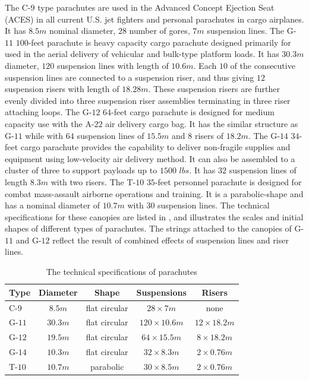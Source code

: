 The C-$9$ type parachutes are used in the Advanced Concept Ejection Seat (ACES) in all current U.S. jet fighters and personal parachutes in cargo airplanes. It has $8.5m$ nominal diameter, $28$ number of gores, $7m$ suspension lines. 
The G-$11$ $100$-feet parachute is heavy capacity cargo parachute designed primarily for used in the aerial delivery of vehicular and bulk-type platform loads. It has $30.3m$ diameter, $120$ suspension lines with length of $10.6m$. Each $10$ of the consecutive suspension lines are connected to a suspension riser, and thus giving $12$ suspension risers with length of $18.28m$. These suspension risers are further evenly divided into three suspension riser assemblies terminating in three riser attaching loops. 
The G-$12$ $64$-feet cargo parachute is designed for medium capacity use with the A-$22$ air delivery cargo bag. It has the similar structure as G-$11$ while with $64$ suspension lines of $15.5m$ and $8$ risers of $18.2m$. 
The G-$14$ $34$-feet cargo parachute provides the capability to deliver non-fragile supplies and equipment using low-velocity air delivery method. It can also be assembled to a cluster of three to support payloads up to $1500$ $lbs$. It has $32$ suspension lines of length $8.3m$ with two risers. 
The T-$10$ $35$-feet personnel parachute is designed for combat mass-assault airborne operations and training. It is a parabolic-shape and has a nominal diameter of $10.7m$ with $30$ suspension lines. The technical specifications for these canopies are listed in , and  illustrates the scales and initial shapes of different types of parachutes. The strings attached to the canopies of G-$11$ and G-$12$ reflect the result of combined effects of suspension lines and riser lines.
\begin{table}
\centering
\begin{tabular}{lcccc}
\hline\hline
Type   & Diameter & Shape 		  & Suspensions        & Risers \\
\hline
C-$9$  & $8.5m$   & flat circular & $28\times 7m$     & none   \\
G-$11$ & $30.3m$  & flat circular & $120\times 10.6m$ & $12\times 18.2m$ \\
G-$12$ & $19.5m$  & flat circular & $64\times 15.5m$  & $8\times 18.2m$ \\
G-$14$ & $10.3m$  & flat circular & $32\times 8.3m$   & $2\times 0.76m$ \\
T-$10$ & $10.7m$  & parabolic     & $30\times 8.5m$   & $2\times 0.76m$\\
\hline
\end{tabular}
\caption{The technical specifications of parachutes}\label{parachute_specification}
\end{table}

